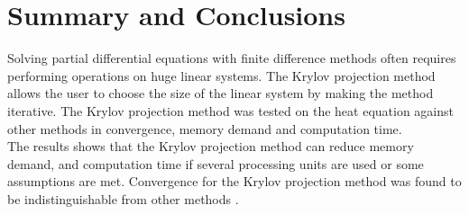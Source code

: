 \section*{Summary and Conclusions}
Solving partial differential equations with finite difference methods often requires performing operations on huge linear systems. The Krylov projection method allows the user to choose the size of the linear system by making the method iterative. The Krylov projection method was tested on the heat equation against other methods in convergence, memory demand and computation time. \\

The results shows that the Krylov projection method can reduce memory demand, and computation time if several processing units are used or some assumptions are met. Convergence for the Krylov projection method was found to be indistinguishable from other methods .


